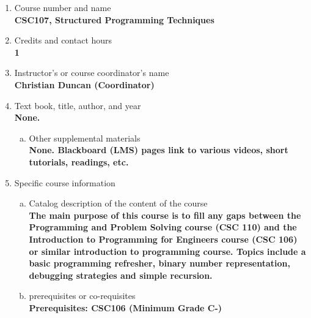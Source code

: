 \label{CSC107}  %
\begin{enumerate}[1.]
\item Course number and name\\
  {\bfseries
    CSC107, Structured Programming Techniques
  }
  
\item Credits and contact hours\\
  {\bfseries
    1  %
  }

\item Instructor's or course coordinator's name\\
  {\bfseries
    Christian Duncan (Coordinator)    
  }

\item Text book, title, author, and year\\
  {\bfseries
    None.
  }
\begin{enumerate}[a.]
\item Other supplemental materials\\
  {\bfseries
    None. Blackboard (LMS) pages link to various videos, short tutorials, readings, etc. 
  }
\end{enumerate}

\item Specific course information
\begin{enumerate}[a.]  
\item Catalog description of the content of the course\\
  {\bfseries
The main purpose of this course is to fill any gaps between the Programming and Problem Solving course (CSC 110) and
the Introduction to Programming for Engineers course (CSC 106) or similar introduction to programming course.
Topics include a basic programming refresher, binary number representation, debugging strategies and simple recursion.
  }

\item prerequisites or co-requisites\\
  {\bfseries
    Prerequisites: CSC106 (Minimum Grade C-) %
  }


\end{enumerate}
\end{enumerate}

